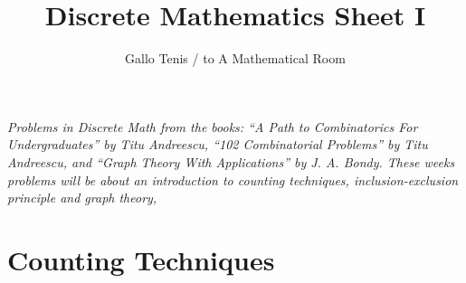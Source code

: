 \documentclass{article}
\title{Discrete Mathematics Sheet I}
\author{Gallo Tenis / to A Mathematical Room}
\theoremstyle{remark}
\begin{document}
\maketitle

\begin{center}
    \textit{
        Problems in Discrete Math from the books: ``A Path to Combinatorics For Undergraduates'' by Titu Andreescu, ``102 Combinatorial Problems'' by Titu Andreescu,
        and ``Graph Theory With Applications'' by J. A. Bondy.
        These weeks problems will be about an introduction to counting techniques, inclusion-exclusion principle and graph theory,
        }
\end{center}
\section*{Counting Techniques}
\end{document}
